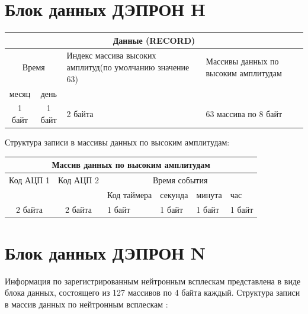 \section{Блок данных ДЭПРОН H}


\small
\begin{center}
	\begin{tabularx}{\textwidth}{|c|c|X|X|}
		\hline
		\multicolumn{4}{|c|}{Данные 
		(RECORD)}                                                               
		                           \\
		 \hline
		\multicolumn{2}{|c|}{Время} & Индекс массива высоких амплитуд(по 
		умолчанию значение 63) & Массивы данных по высоким амплитудам \\ 
		\cline{1-2}
		месяц  &        день        
		&                                                           &  \\ \hline
		1 байт &       1 байт       & 2 
		байта                                                   & 63 массива  
		по 8 байт                \\ \hline
	\end{tabularx}  
\end{center}
\normalsize
	



Структура записи в массивы данных по высоким амплитудам:

\small
\begin{center}
	\begin{tabularx}{\textwidth}{|c|c|X|X|X|X|}
		\hline
		\multicolumn{6}{|c|}{Массив данных по высоким амплитудам}       \\ 
		\hline
		Код АЦП 1 & Код АЦП 2 &   \multicolumn{4}{c|}{Время события}    \\ 
		\cline{3-6}
		          &           & Код таймера & секунда & минута & час    \\ 
		          \hline
		 2 байта  &  2 байта  & 1 байт      & 1 байт  & 1 байт & 1 байт \\ 
		 \hline
	\end{tabularx}  
\end{center}
\normalsize




\section{Блок данных ДЭПРОН N}

Информация по зарегистрированным нейтронным всплескам представлена в виде блока данных, состоящего из 127 массивов  по 4 байта каждый.
Структура записи в массив данных по нейтронным всплескам :

